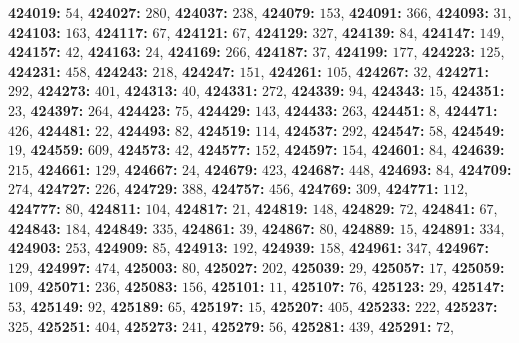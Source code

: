 \textsf{\bfseries 424019:} $54$, \textsf{\bfseries 424027:} $280$, \textsf{\bfseries 424037:} $238$, \textsf{\bfseries 424079:} $153$, \textsf{\bfseries 424091:} $366$, \textsf{\bfseries 424093:} $31$, \textsf{\bfseries 424103:} $163$, \textsf{\bfseries 424117:} $67$, \textsf{\bfseries 424121:} $67$, \textsf{\bfseries 424129:} $327$, \textsf{\bfseries 424139:} $84$, \textsf{\bfseries 424147:} $149$, \textsf{\bfseries 424157:} $42$, \textsf{\bfseries 424163:} $24$, \textsf{\bfseries 424169:} $266$, \textsf{\bfseries 424187:} $37$, \textsf{\bfseries 424199:} $177$, \textsf{\bfseries 424223:} $125$, \textsf{\bfseries 424231:} $458$, \textsf{\bfseries 424243:} $218$, \textsf{\bfseries 424247:} $151$, \textsf{\bfseries 424261:} $105$, \textsf{\bfseries 424267:} $32$, \textsf{\bfseries 424271:} $292$, \textsf{\bfseries 424273:} $401$, \textsf{\bfseries 424313:} $40$, \textsf{\bfseries 424331:} $272$, \textsf{\bfseries 424339:} $94$, \textsf{\bfseries 424343:} $15$, \textsf{\bfseries 424351:} $23$, \textsf{\bfseries 424397:} $264$, \textsf{\bfseries 424423:} $75$, \textsf{\bfseries 424429:} $143$, \textsf{\bfseries 424433:} $263$, \textsf{\bfseries 424451:} $8$, \textsf{\bfseries 424471:} $426$, \textsf{\bfseries 424481:} $22$, \textsf{\bfseries 424493:} $82$, \textsf{\bfseries 424519:} $114$, \textsf{\bfseries 424537:} $292$, \textsf{\bfseries 424547:} $58$, \textsf{\bfseries 424549:} $19$, \textsf{\bfseries 424559:} $609$, \textsf{\bfseries 424573:} $42$, \textsf{\bfseries 424577:} $152$, \textsf{\bfseries 424597:} $154$, \textsf{\bfseries 424601:} $84$, \textsf{\bfseries 424639:} $215$, \textsf{\bfseries 424661:} $129$, \textsf{\bfseries 424667:} $24$, \textsf{\bfseries 424679:} $423$, \textsf{\bfseries 424687:} $448$, \textsf{\bfseries 424693:} $84$, \textsf{\bfseries 424709:} $274$, \textsf{\bfseries 424727:} $226$, \textsf{\bfseries 424729:} $388$, \textsf{\bfseries 424757:} $456$, \textsf{\bfseries 424769:} $309$, \textsf{\bfseries 424771:} $112$, \textsf{\bfseries 424777:} $80$, \textsf{\bfseries 424811:} $104$, \textsf{\bfseries 424817:} $21$, \textsf{\bfseries 424819:} $148$, \textsf{\bfseries 424829:} $72$, \textsf{\bfseries 424841:} $67$, \textsf{\bfseries 424843:} $184$, \textsf{\bfseries 424849:} $335$, \textsf{\bfseries 424861:} $39$, \textsf{\bfseries 424867:} $80$, \textsf{\bfseries 424889:} $15$, \textsf{\bfseries 424891:} $334$, \textsf{\bfseries 424903:} $253$, \textsf{\bfseries 424909:} $85$, \textsf{\bfseries 424913:} $192$, \textsf{\bfseries 424939:} $158$, \textsf{\bfseries 424961:} $347$, \textsf{\bfseries 424967:} $129$, \textsf{\bfseries 424997:} $474$, \textsf{\bfseries 425003:} $80$, \textsf{\bfseries 425027:} $202$, \textsf{\bfseries 425039:} $29$, \textsf{\bfseries 425057:} $17$, \textsf{\bfseries 425059:} $109$, \textsf{\bfseries 425071:} $236$, \textsf{\bfseries 425083:} $156$, \textsf{\bfseries 425101:} $11$, \textsf{\bfseries 425107:} $76$, \textsf{\bfseries 425123:} $29$, \textsf{\bfseries 425147:} $53$, \textsf{\bfseries 425149:} $92$, \textsf{\bfseries 425189:} $65$, \textsf{\bfseries 425197:} $15$, \textsf{\bfseries 425207:} $405$, \textsf{\bfseries 425233:} $222$, \textsf{\bfseries 425237:} $325$, \textsf{\bfseries 425251:} $404$, \textsf{\bfseries 425273:} $241$, \textsf{\bfseries 425279:} $56$, \textsf{\bfseries 425281:} $439$, \textsf{\bfseries 425291:} $72$, 
